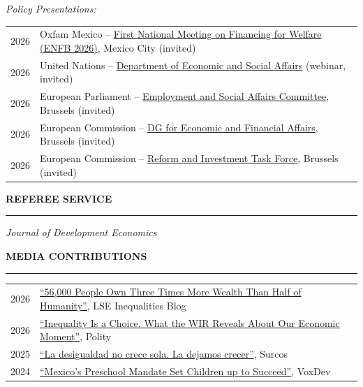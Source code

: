 \documentclass[11pt,letterpaper]{article}
\renewcommand{\section}[1]{%
  \vspace{0.8em}%
  {\large\bfseries\MakeUppercase{#1}}%
  \vspace{0.3em}%
  \hrule%
  \vspace{0.4em}%
}
\begin{document}
\vspace{0.3em}

\textit{Policy Presentations:}

\begin{tabular}{@{}lp{}@{}}
2026 & Oxfam Mexico -- \href{https://oxfam.mx/enfb-2026/}{First National Meeting on Financing for Welfare (ENFB 2026)}, Mexico City (invited) \\
2026 & United Nations -- \href{https://www.un.org/en/desa}{Department of Economic and Social Affairs} (webinar, invited) \\
2026 & European Parliament -- \href{https://www.europarl.europa.eu/committees/en/empl/home/highlights}{Employment and Social Affairs Committee}, Brussels (invited) \\
2026 & European Commission -- \href{https://commission.europa.eu/about/departments-and-executive-agencies/economic-and-financial-affairs\_en}{DG for Economic and Financial Affairs}, Brussels (invited) \\
2026 & European Commission -- \href{https://commission.europa.eu/about/departments-and-executive-agencies/reform-and-investment-task-force\_en}{Reform and Investment Task Force}, Brussels (invited) \\
\end{tabular}


\section{Referee Service}

\textit{Journal of Development Economics}


\section{Media Contributions}

\begin{tabular}{@{}ll@{}}
2026 & \href{https://blogs.lse.ac.uk/inequalities/2026/05/12/56000-people-own-three-times-more-wealth-than-half-of-humanity/}{``56,000 People Own Three Times More Wealth Than Half of Humanity''}, LSE Inequalities Blog \\
2026 & \href{https://www.politybooks.com/blog-detail/inequality-is-a-choice-what-the-world-inequality-report-2026-reveals-about-our-economic-moment}{``Inequality Is a Choice. What the WIR Reveals About Our Economic Moment''}, Polity \\
2025 & \href{https://surcos.com.mx/la-desigualdad-no-crece-sola-la-dejamos-crecer/}{``La desigualdad no crece sola. La dejamos crecer''}, Surcos \\
2024 & \href{https://voxdev.org/topic/education/mexicos-preschool-mandate-set-children-succeed}{``Mexico's Preschool Mandate Set Children up to Succeed''}, VoxDev \\
\end{tabular}
\end{document}
